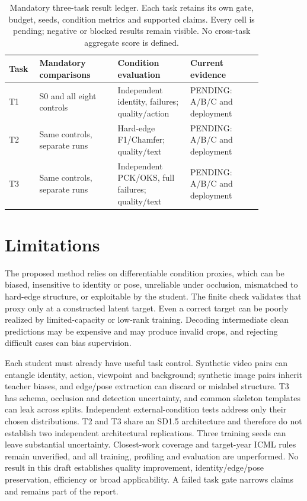 \documentclass[11pt]{article}
\newcommand{\pending}{\textsf{PENDING}}
\begin{document}
\begin{table}[t]
\centering\small
\begin{tabular}{p{0.08\linewidth}p{0.27\linewidth}p{0.25\linewidth}p{0.25\linewidth}}
\toprule
Task & Mandatory comparisons & Condition evaluation & Current evidence\\
\midrule
T1 & S0 and all eight controls & Independent identity, failures; quality/action & \pending: A/B/C and deployment\\
T2 & Same controls, separate runs & Hard-edge F1/Chamfer; quality/text & \pending: A/B/C and deployment\\
T3 & Same controls, separate runs & Independent PCK/OKS, full failures; quality/text & \pending: A/B/C and deployment\\
\bottomrule
\end{tabular}
\caption{Mandatory three-task result ledger. Each task retains its own gate, budget, seeds, condition metrics and supported claims. Every cell is pending; negative or blocked results remain visible. No cross-task aggregate score is defined.}
\end{table}

\section{Limitations}
The proposed method relies on differentiable condition proxies, which can be biased, insensitive to identity or pose, unreliable under occlusion, mismatched to hard-edge structure, or exploitable by the student. The finite check validates that proxy only at a constructed latent target. Even a correct target can be poorly realized by limited-capacity or low-rank training. Decoding intermediate clean predictions may be expensive and may produce invalid crops, and rejecting difficult cases can bias supervision.

Each student must already have useful task control. Synthetic video pairs can entangle identity, action, viewpoint and background; synthetic image pairs inherit teacher biases, and edge/pose extraction can discard or mislabel structure. T3 has schema, occlusion and detection uncertainty, and common skeleton templates can leak across splits. Independent external-condition tests address only their chosen distributions. T2 and T3 share an SD1.5 architecture and therefore do not establish two independent architectural replications. Three training seeds can leave substantial uncertainty. Closest-work coverage and target-year ICML rules remain unverified, and all training, profiling and evaluation are unperformed. No result in this draft establishes quality improvement, identity/edge/pose preservation, efficiency or broad applicability. A failed task gate narrows claims and remains part of the report.
\end{document}
